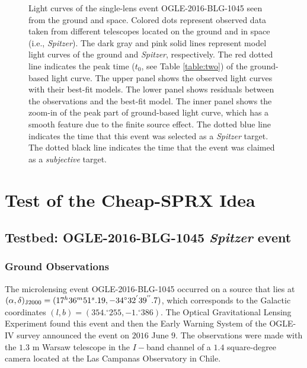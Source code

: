 \documentclass[10pt]{emulateapj}
\begin{document}
\begin{figure*}[htb!]
\caption{
Light curves of the single-lens event OGLE-2016-BLG-1045 seen from the ground and space. Colored 
dots represent observed data taken from different telescopes located on the ground and in space 
(i.e., {\it Spitzer}). The dark gray and pink solid lines represent model light curves of the 
ground and {\it Spitzer}, respectively. The red dotted line indicates the peak time ($t_0$, see 
Table \ref{table:two}) of the ground-based light curve. The upper panel shows the observed light 
curves with their best-fit models. The lower panel shows residuals between the observations and 
the best-fit model. The inner panel shows the zoom-in of the peak part of ground-based light curve, 
which has a smooth feature due to the finite source effect. The dotted blue line indicates the time 
that this event was selected as a {\it Spitzer} target. The dotted black line indicates the time 
that the event was claimed as a {\it subjective} target.
\label{fig:one}}
\end{figure*}

\section{Test of the Cheap-SPRX Idea}

\subsection{Testbed: OGLE-2016-BLG-1045 {\it Spitzer} event}

\subsubsection{Ground Observations}

 The microlensing event OGLE-2016-BLG-1045 occurred on a source that lies at $(\alpha,\delta)_{\rm J2000}=
(17^{h}36^{m}51^{s}\\.19,-34^{\circ}32^{'}39^{''}.7)$, which corresponds to the Galactic coordinates $(l,b)
=(354.^{\circ}255,-1.^{\circ}386)$. The Optical Gravitational Lensing Experiment \citep[OGLE-IV:][]{udalski15a} found this 
event and then the Early Warning System \citep{udalski94,udalski03} of the OGLE-IV survey announced the event 
on $2016$ June $9$. The observations were made with the $1.3$ m Warsaw telescope in the $I-$band channel 
of a $1.4$ square-degree camera located at the Las Campanas Observatory in Chile.
\end{document}
